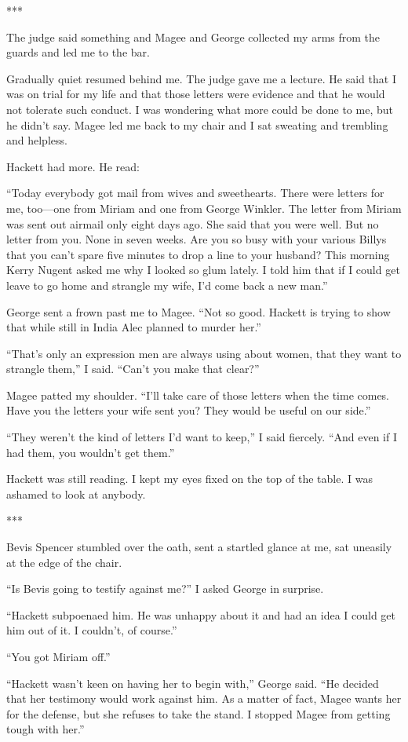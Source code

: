 {***

The judge said something and Magee and George collected my arms from the guards and led me to the bar.

Gradually quiet resumed behind me. The judge gave me a lecture. He said that I was on trial for my life and that those letters were evidence and that he would not tolerate such conduct. I was wondering what more could be done to me, but he didn’t say. Magee led me back to my chair and I sat sweating and trembling and helpless.

Hackett had more. He read:

“Today everybody got mail from wives and sweethearts. There were letters for me, too—one from Miriam and one from George Winkler. The letter from Miriam was sent out airmail only eight days ago. She said that you were well. But no letter from you. None in seven weeks. Are you so busy with your various Billys that you can’t spare five minutes to drop a line to your husband? This morning Kerry Nugent asked me why I looked so glum lately. I told him that if I could get leave to go home and strangle my wife, I’d come back a new man.”

George sent a frown past me to Magee. “Not so good. Hackett is trying to show that while still in India Alec planned to murder her.”

“That’s only an expression men are always using about women, that they want to strangle them,” I said. “Can’t you make that clear?”

Magee patted my shoulder. “I’ll take care of those letters when the time comes. Have you the letters your wife sent you? They would be useful on our side.”

“They weren’t the kind of letters I’d want to keep,” I said fiercely. “And even if I had them, you wouldn’t get them.”

Hackett was still reading. I kept my eyes fixed on the top of the table. I was ashamed to look at anybody.

***

Bevis Spencer stumbled over the oath, sent a startled glance at me, sat uneasily at the edge of the chair.

“Is Bevis going to testify against me?” I asked George in surprise.

“Hackett subpoenaed him. He was unhappy about it and had an idea I could get him out of it. I couldn’t, of course.”

“You got Miriam off.”

“Hackett wasn’t keen on having her to begin with,” George said. “He decided that her testimony would work against him. As a matter of fact, Magee wants her for the defense, but she refuses to take the stand. I stopped Magee from getting tough with her.”

}
